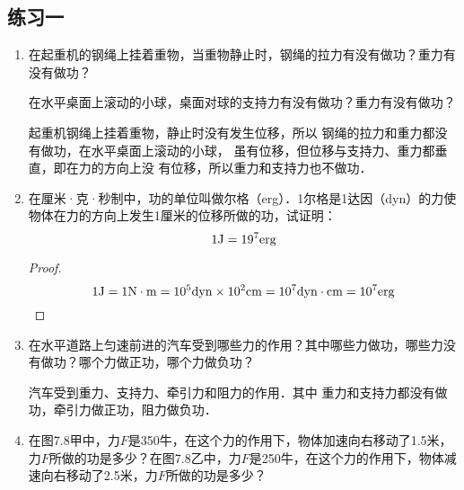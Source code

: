 \subsection{练习一}
\begin{enumerate}
    \item 在起重机的钢绳上挂着重物，当重物静止时，钢绳的拉力有没有做功？重力有没有做功？

    在水平桌面上滚动的小球，桌面对球的支持力有没有做功？重力有没有做功？

    \begin{solution}
    起重机钢绳上挂着重物，静止时没有发生位移，所以
钢绳的拉力和重力都没有做功，在水平桌面上滚动的小球，
虽有位移，但位移与支持力、重力都垂直，即在力的方向上没
有位移，所以重力和支持力也不做功．
    \end{solution}
    \item 在厘米·克·秒制中，功的单位叫做尔格（erg）．1尔格是1达因（dyn）的力使物体在力的方向上发生1厘米的位移所做的功，试证明：
    \[1{\rm J}=19^7{\rm erg} \]

    \begin{proof}
\[1{\rm J}=1{\rm N\cdot m}=10^5{\rm dyn}\x 10^2{\rm cm}=10^7{\rm dyn\cdot cm}=10^7{\rm erg}\]
    \end{proof}
    \item 在水平道路上匀速前进的汽车受到哪些力的作用？其中哪些力做功，哪些力没有做功？哪个力做正功，哪个力做负功？

    \begin{solution}
        汽车受到重力、支持力、牵引力和阻力的作用．其中
        重力和支持力都没有做功，牵引力做正功，阻力做负功．
    \end{solution}
    \item 在图7.8甲中，力$F$是350牛，在这个力的作用下，物体加速向右移动了1.5米，力$F$所做的功是多少？在图7.8乙中，力$F$是250牛，在这个力的作用下，物体减速向右移动了2.5米，力$F$所做的功是多少？

\begin{figure}[htp]\centering
{}\qquad 
\begin{tikzpicture}[>=stealth, thick, scale=1]


\end{tikzpicture}
\end{figure}
\end{enumerate}
